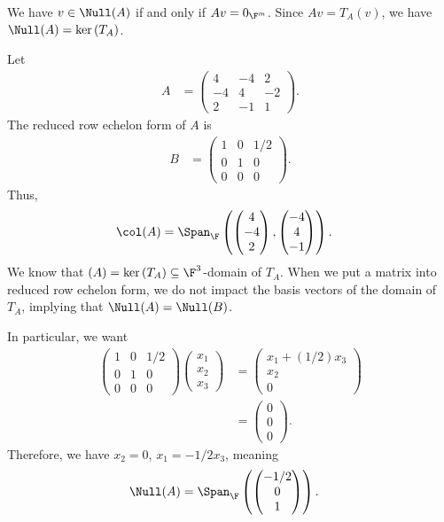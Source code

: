 \documentclass[10pt]{mypackage}
\begin{document}
We have $v\in \Null(A)$ if and only if $Av = 0_{\F^m}$. Since $Av = T_A(v)$, we have $\Null(A) = \ker\left(T_A\right)$.
\begin{example}
  Let
  \begin{align*}
    A &= \begin{pmatrix}4 & -4 & 2 \\ -4 & 4 & -2 \\ 2 & -1 & 1\end{pmatrix}.
  \end{align*}
  The reduced row echelon form of $A$ is
  \begin{align*}
    B &= \begin{pmatrix}1 & 0 & 1/2 \\ 0 & 1 & 0 \\ 0 & 0 & 0\end{pmatrix}.
  \end{align*}
  Thus,
  \begin{align*}
    \col(A) &= \Span_{\F}\left( \begin{pmatrix}4\\-4\\2\end{pmatrix}, \begin{pmatrix}-4\\4\\-1\end{pmatrix}\right).
  \end{align*}
  We know that $\null(A) = \ker\left(T_A\right) \subseteq \F^{3}$-domain of $T_A$. When we put a matrix into reduced row echelon form, we do not impact the basis vectors of the domain of $T_A$, implying that $\Null(A) = \Null(B)$.\newline

  In particular, we want
  \begin{align*}
    \begin{pmatrix}1 & 0 & 1/2\\0 & 1 & 0 \\ 0 & 0 & 0\end{pmatrix} \begin{pmatrix}x_1\\x_2\\x_3\end{pmatrix} &= \begin{pmatrix}x_1 + \left(1/2\right) x_3\\x_2\\0\end{pmatrix}\\
                     &= \begin{pmatrix}0\\0\\0\end{pmatrix}.
  \end{align*}
  Therefore, we have $x_2 = 0$, $x_1 = -1/2 x_3$, meaning
  \begin{align*}
    \Null(A) &= \Span_{\F}\left( \begin{pmatrix}-1/2\\0\\1\end{pmatrix}\right).
  \end{align*}
\end{example}
\end{document}
